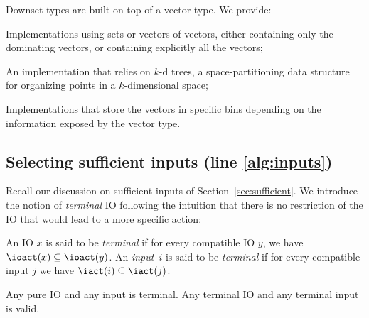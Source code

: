 \documentclass[runningheads,a4paper]{llncs}
\begin{document}
Downset types are built on top of a vector type.  We provide:
\begin{compactitem}
\item Implementations using sets or vectors of vectors, either containing only
  the dominating vectors, or containing explicitly all the vectors;
\item An implementation that relies on \(k\)-d trees, a space-partitioning data
  structure for organizing points in a \(k\)-dimensional space;~\cite{bcko08}
\item Implementations that store the vectors in specific bins depending on the
  information exposed by the vector type.
\end{compactitem}

\subsection{Selecting sufficient inputs (line \ref{alg:inputs})}\label{sec:suff}


Recall our discussion on sufficient inputs of Section~\ref{sec:sufficient}.  We
introduce the notion of \emph{terminal} IO following
the intuition that there
is
no restriction of the IO that would lead to a more specific action:
\begin{definition}
  An IO \(x\) is said to be \emph{terminal} if for every compatible IO \(y\), we
  have \(\ioact(x) \subseteq \ioact(y)\).  %
  An \emph{input}~\(i\) is said to be
  \emph{terminal} if for every compatible input \(j\) we have
  \(\iact(i) \subseteq \iact(j)\).
\end{definition}

\begin{proposition}
  Any pure IO and any input is terminal.  Any terminal IO and any terminal input
  is valid.
\end{proposition}
\end{document}
